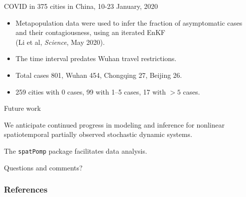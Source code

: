 \documentclass{beamer}
\begin{document}

\begin{frame}{COVID in 375 cities in China, 10-23 January, 2020}

  \begin{itemize}
  \item Metapopulation data were used to infer the fraction of asymptomatic cases and their contagiousness, using an iterated EnKF \\
    (Li et al, {\it Science}, May 2020).
   \item
    The time interval predates Wuhan travel restrictions.
   \item Total cases 801, Wuhan 454, Chongqing 27, Beijing 26.
   \item 259 cities with 0 cases, 99 with 1--5 cases, 17 with $>5$ cases.
\end{itemize}     

\end{frame}

\begin{frame}{Future work}

  \newcommand\futuresep{\vspace{5mm}}
  
  \begin{myitemize}

  \item We anticipate continued progress in modeling and inference for nonlinear spatiotemporal partially observed stochastic dynamic systems.

    \futuresep
    
  \item The \texttt{spatPomp} package facilitates data analysis.

    \futuresep

    \item Questions and comments?
    
\end{myitemize}

\end{frame}

\nocite{bjornstad01,grenfell04,breto19,rebeschini15,ng02,ionides21,wheeler23,lee20,asfaw23arxiv}

\begin{frame}[allowframebreaks]
\frametitle{References}


\end{frame}

\end{document}
